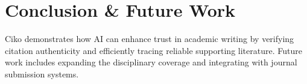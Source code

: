 \documentclass{article}
\begin{document}
\section{Conclusion \& Future Work}
Ciko demonstrates how AI can enhance trust in academic writing by verifying citation authenticity and efficiently tracing reliable supporting literature. Future work includes expanding the disciplinary coverage and integrating with journal submission systems.



\end{document}
